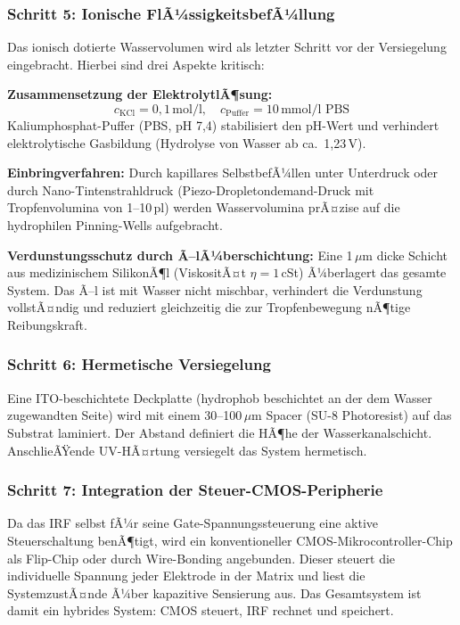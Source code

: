 ﻿\documentclass[a4paper,12pt]{scrreprt}
\theoremstyle{definition}
\begin{document}
\subsubsection{Schritt 5: Ionische FlÃ¼ssigkeitsbefÃ¼llung}

Das ionisch dotierte Wasservolumen wird als letzter Schritt vor der Versiegelung
eingebracht. Hierbei sind drei Aspekte kritisch:

\textbf{Zusammensetzung der ElektrolytlÃ¶sung:}
\begin{equation}
	c_{\mathrm{KCl}} = 0{,}1\,\text{mol/l}, \quad c_{\mathrm{Puffer}} = 10\,\text{mmol/l PBS}
	\label{eq:elektrolytkonzentration}
\end{equation}
Kaliumphosphat-Puffer (PBS, pH 7{,}4) stabilisiert den pH-Wert und verhindert
elektrolytische Gasbildung (Hydrolyse von Wasser ab ca.\ 1{,}23\,V).

\textbf{Einbringverfahren:}
Durch kapillares SelbstbefÃ¼llen unter Unterdruck oder durch Nano-Tintenstrahldruck
(Piezo-Dropletondemand-Druck mit Tropfenvolumina von 1--10\,pl) werden
Wasservolumina prÃ¤zise auf die hydrophilen Pinning-Wells aufgebracht.

\textbf{Verdunstungsschutz durch Ã–lÃ¼berschichtung:}
Eine 1\,$\mu$m dicke Schicht aus medizinischem SilikonÃ¶l (ViskositÃ¤t
$\eta = 1$\,cSt) Ã¼berlagert das gesamte System. Das Ã–l ist mit Wasser
nicht mischbar, verhindert die Verdunstung vollstÃ¤ndig und reduziert
gleichzeitig die zur Tropfenbewegung nÃ¶tige Reibungskraft.

\subsubsection{Schritt 6: Hermetische Versiegelung}

Eine ITO-beschichtete Deckplatte (hydrophob beschichtet an der dem Wasser
zugewandten Seite) wird mit einem 30--100\,$\mu$m Spacer (SU-8 Photoresist)
auf das Substrat laminiert. Der Abstand definiert die HÃ¶he der Wasserkanalschicht.
AnschlieÃŸende UV-HÃ¤rtung versiegelt das System hermetisch.

\subsubsection{Schritt 7: Integration der Steuer-CMOS-Peripherie}

Da das IRF selbst fÃ¼r seine Gate-Spannungssteuerung eine aktive Steuerschaltung
benÃ¶tigt, wird ein konventioneller CMOS-Mikrocontroller-Chip als Flip-Chip
oder durch Wire-Bonding angebunden. Dieser steuert die individuelle Spannung
jeder Elektrode in der Matrix und liest die SystemzustÃ¤nde Ã¼ber kapazitive
Sensierung aus. Das Gesamtsystem ist damit ein hybrides System: CMOS steuert,
IRF rechnet und speichert.
\end{document}
